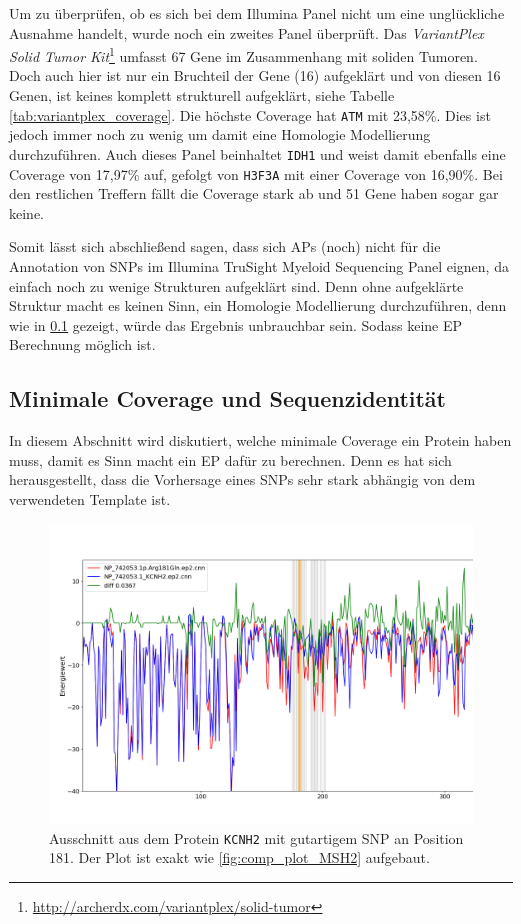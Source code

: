Um zu überprüfen, ob es sich bei dem Illumina Panel nicht um eine unglückliche Ausnahme handelt, wurde noch ein zweites Panel überprüft. Das \emph{VariantPlex Solid Tumor Kit}\footnote{\url{http://archerdx.com/variantplex/solid-tumor}} umfasst 67 Gene im Zusammenhang mit soliden Tumoren. Doch auch hier ist nur ein Bruchteil der Gene (16) aufgeklärt und von diesen 16 Genen, ist keines komplett strukturell aufgeklärt, siehe Tabelle \ref{tab:variantplex_coverage}. Die höchste Coverage hat \texttt{ATM} mit 23,58\%. Dies ist jedoch immer noch zu wenig um damit eine Homologie Modellierung durchzuführen. Auch dieses Panel beinhaltet \texttt{IDH1} und weist damit ebenfalls eine Coverage von 17,97\% auf, gefolgt von \texttt{H3F3A} mit einer Coverage von 16,90\%. Bei den restlichen Treffern fällt die Coverage stark ab und 51 Gene haben sogar gar keine.

Somit lässt sich abschließend sagen, dass sich \ac{APs} (noch) nicht für die Annotation von \ac{SNP}s im Illumina TruSight Myeloid Sequencing Panel eignen, da einfach noch zu wenige Strukturen aufgeklärt sind. Denn ohne aufgeklärte Struktur macht es keinen Sinn, ein Homologie Modellierung durchzuführen, denn wie in \ref{sec:min_coverage} gezeigt, würde das Ergebnis unbrauchbar sein. Sodass keine \ac{EP} Berechnung möglich ist. 


\subsection{Minimale Coverage und Sequenzidentität}
\label{sec:min_coverage}

In diesem Abschnitt wird diskutiert, welche minimale Coverage ein Protein haben muss, damit es Sinn macht ein \ac{EP} dafür zu berechnen. Denn es hat sich herausgestellt, dass die Vorhersage eines \ac{SNP}s sehr stark abhängig von dem verwendeten Template ist.

\begin{figure}[H]
    \centering
    \includegraphics[width=.99\textwidth]{images/comp_plot_KCNH2_Arg181Gln.png}
    \caption{Ausschnitt aus dem Protein \texttt{KCNH2} mit gutartigem \ac{SNP} an Position 181. Der Plot ist exakt wie \ref{fig:comp_plot_MSH2} aufgebaut.}
    \label{fig:fail_ep}
\end{figure}

